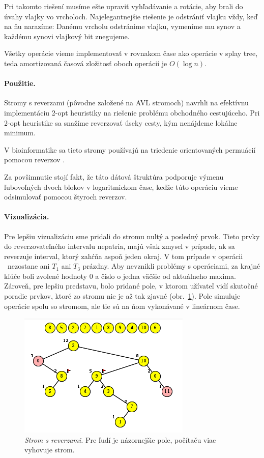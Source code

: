 Pri takomto riešení musíme ešte upraviť vyhľadávanie a rotácie, aby brali do úvahy vlajky vo vrcholoch.
Najelegantnejšie riešenie je odstrániť vlajku vždy, keď na ňu narazíme:
Danému vrcholu odstránime vlajku, vymeníme mu synov a každému synovi vlajkový bit znegujeme.

Všetky operácie vieme implementovať v rovnakom čase ako operácie v splay tree, teda amortizovaná 
časová zložitosť oboch operácií je $O(\log n)$.

\paragraph{Použitie.}
Stromy s reverzami (pôvodne založené na AVL stromoch) navrhli \citet{chrobak}
na efektívnu implementáciu 2-opt heuristiky na riešenie problému obchodného cestujúceho.
Pri 2-opt heuristike sa snažíme reverzovať úseky cesty, kým nenájdeme lokálne minimum.

V bioinformatike sa tieto stromy používajú na triedenie orientovaných permuácií
pomocou reverzov \citep{reversals,reversals2}.

Za povšimnutie stojí fakt, že táto dátová štruktúra podporuje výmenu ľubovoľných dvoch blokov
v logaritmickom čase, keďže túto operáciu vieme odsimulovať pomocou štyroch reverzov.

\paragraph{Vizualizácia.}
Pre lepšiu vizualizáciu sme pridali do stromu nultý a posledný prvok. Tieto prvky
do reverzovateľného intervalu nepatria, majú však zmysel v prípade, ak sa reverzuje
interval, ktorý zahŕňa aspoň jeden okraj. V tom prípade v operácii \reverse\ nezostane
ani $T_1$ ani $T_3$ prázdny. Aby nevznikli problémy s operáciami, za krajné kľúče boli
zvolené hodnoty $0$ a číslo o jedna väčšie od aktuálneho maxima. Zároveň, pre lepšiu
predstavu, bolo pridané pole, v ktorom užívateľ vidí skutočné poradie prvkov, ktoré
zo stromu nie je až tak zjavné (obr.~\ref{img:rev1}). Pole simuluje operácie spolu so stromom, ale tie sú
na ňom vykonávané v lineárnom čase.

\begin{figure}
\includegraphics[width=\columnwidth]{obrazky/reversal.png}
\caption{\emph{Strom s reverzami.} Pre ľudí je názornejšie pole, počítaču viac vyhovuje strom.}
\label{img:rev1}
\end{figure}

